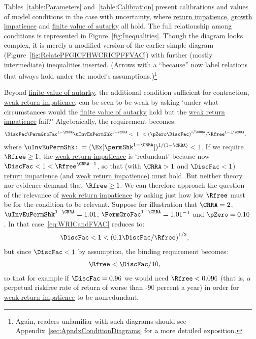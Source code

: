 \documentclass[BufferStockTheory]{subfiles}
\begin{document}
Tables~\ref{table:Parameters} and~\ref{table:Calibration} present calibrations and values of model conditions in the case with uncertainty, where \hyperlink{RIC}{return impatience}, \hyperlink{GICRaw}{growth impatience} and \hyperlink{FVAC}{finite value of autarky} all hold.
The full relationship among conditions is represented in Figure~\ref{fig:Inequalities}.
Though the diagram looks complex, it is merely a modified version of the earlier simple diagram (Figure~\ref{fig:RelatePFGICFHWCRICPFFVAC}) with further (mostly intermediate) inequalities inserted.
(Arrows with a ``because'' now label relations that always hold under the model's assumptions.)\footnote{Again, readers unfamiliar with such diagrams should see Appendix~\ref{sec:ApndxConditionDiagrams} for a more detailed exposition.}

\renewcommand{\figName}{Inequalities} 
\renewcommand{\figFile}{\figName} 
\hypertarget{\figFile}{}

Beyond \hyperlink{FVAC}{finite value of autarky},
the additional condition sufficient for contraction, \hyperlink{WRIC}{weak return impatience}, can be seen to be weak by asking `under what circumstances would the \hyperlink{FVAC}{finite value of autarky} hold but the \hyperlink{WRIC}{weak return impatience} fail?'  Algebraically, the requirement becomes:
%
\begin{align}
  \DiscFac \PermGroFac^{1-\CRRA}\uInvEuPermShk^{1-\CRRA} & < ~ 1 ~ <  {(\pZero \DiscFac)}^{1/\CRRA}/\Rfree^{1-1/\CRRA}. \label{eq:WRICandFVAC}
\end{align}
%
where $\uInvEuPermShk \colon = (\Ex[\permShk^{1-\CRRA}])^{1/(1-\CRRA)} < 1$.
If we require $\Rfree \geq 1$, the \hyperlink{WRIC}{weak return impatience} is `redundant' because now $\DiscFac <1<\Rfree^{\CRRA-1}$, so that (with $\CRRA > 1$ and $\DiscFac<1$) \hyperlink{RIC}{return impatience} (and \hyperlink{WRIC}{weak return impatience}) must hold.
But neither theory nor evidence demand that $\Rfree \geq 1$.
We can therefore approach the question of the relevance of \hyperlink{WRIC}{weak return impatience}  by asking just how low $\Rfree$ must be for the condition to be relevant.
Suppose for illustration that $\CRRA=2$, $\uInvEuPermShk^{1-\CRRA}=1.01$, $\PermGroFac^{1-\CRRA}=1.01^{-1}$ and $\pZero = 0.10$.
In that case~\eqref{eq:WRICandFVAC} reduces to:
\begin{align*}
  \DiscFac  & < 1 < {(0.1 \DiscFac/\Rfree)}^{1/2},
\end{align*}
but since $\DiscFac < 1$ by assumption, the binding requirement becomes:
\begin{align*}
  \Rfree  & < \DiscFac/10, \notag
\end{align*}
so that for example if $\DiscFac=0.96$ we would need $\Rfree < 0.096$ (that is, a perpetual riskfree rate of return of worse than -90 percent a year) in order for \hyperlink{WRIC}{weak return impatience} to be nonredundant.
\end{document}
